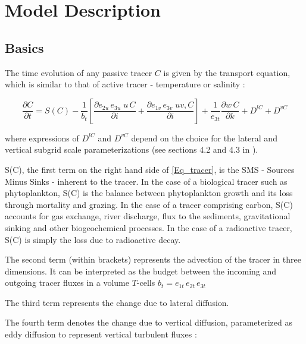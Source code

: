 \documentclass[../main/TOP_manual]{subfiles}
\begin{document}
\newcommand{\cd}{\mathrm{CO_2}}
\newcommand{\Ct}{\mathrm{C_T}}
\newcommand{\pacd}{\mathrm{p^a_{CO_2}}}
\newcommand{\cq}{\mathrm{^{14}C}}
\newcommand{\Dcq}{\Delta ^{14}\mathrm{C}}
\newcommand{\Rq}{\mathrm{^{14}{R}}}

\chapter{Model Description}
\label{chap:ModDes}
\chaptertoc

\section{Basics}
\label{sec:Bas}

The time evolution of any passive tracer $C$ is given by the transport equation, which is similar to that of active tracer - temperature or salinity :

\begin{equation}
\frac{\partial C}{\partial t} = {S(C)} -  \frac{1}{b_t} \left[   \frac{\partial e_{2u}\,e_{3u} \;  u\, C}{\partial i} +   \frac{\partial e_{1v}\,e_{3v} \;  uv, C}{\partial i}  \right] + \frac{1}{e_{3t}} \frac{\partial w\, C}{\partial k} + D^{lC} + D^{vC}
\label{Eq_tracer}
\end{equation}

where expressions of $D^{lC}$ and $D^{vC}$ depend on the choice for the lateral and vertical subgrid scale parameterizations (see sections 4.2 and 4.3 in \cite{nemo_manual}).

{S(C)}, the first term on the right hand side of \autoref{Eq_tracer}, is the SMS - Sources Minus Sinks - inherent to the tracer.
In the case of a biological tracer such as phytoplankton, {S(C)} is the balance between phytoplankton growth and its loss through mortality and grazing.
In the case of a tracer comprising carbon,  {S(C)} accounts for gas exchange, river discharge, flux to the sediments, gravitational sinking and other biogeochemical processes.
In the case of a radioactive tracer, {S(C)} is simply the loss due to radioactive decay.

The second term (within brackets) represents the advection of the tracer in three dimensions.
It can be interpreted as the budget between the incoming and outgoing tracer fluxes in a volume $T$-cells $b_t= e_{1t}\,e_{2t}\,e_{3t}$

The third term represents the change due to lateral diffusion.

The fourth term denotes the change due to vertical diffusion, parameterized as eddy diffusion to represent vertical turbulent fluxes :
\end{document}
